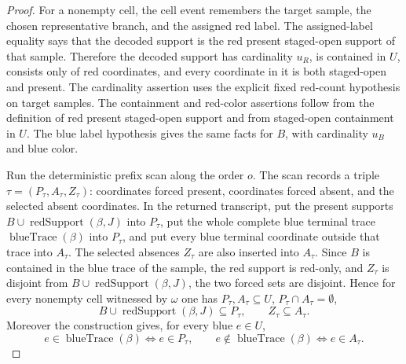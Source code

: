 \begin{proof}
For a nonempty cell, the cell event remembers the target sample, the chosen
representative branch, and the assigned red label.  The assigned-label
equality says that the decoded support is the red present staged-open support
of that sample.  Therefore the decoded support has cardinality \(u_R\), is
contained in \(U\), consists only of red coordinates, and every coordinate in
it is both staged-open and present.  The cardinality assertion uses the
explicit fixed red-count hypothesis on target samples.  The containment and
red-color assertions follow from the definition of red present staged-open
support and from staged-open containment in \(U\).  The blue label hypothesis
gives the same facts for \(B\), with cardinality \(u_B\) and blue color.

Run the deterministic prefix scan along the order \(o\).  The scan records a
triple \(\tau=(P_\tau,A_\tau,Z_\tau)\): coordinates forced present,
coordinates forced absent, and the selected absent coordinates.  In the
returned transcript, put the present supports
\(B\cup\operatorname{redSupport}(\beta,J)\) into \(P_\tau\), put the whole
complete blue terminal trace \(\operatorname{blueTrace}(\beta)\) into
\(P_\tau\), and put every blue terminal coordinate outside that trace into
\(A_\tau\).  The selected absences \(Z_\tau\) are also inserted into
\(A_\tau\).  Since \(B\) is contained in the blue trace of the sample, the
red support is red-only, and \(Z_\tau\) is disjoint from
\(B\cup\operatorname{redSupport}(\beta,J)\), the two forced sets are
disjoint.  Hence for every nonempty cell witnessed by \(\omega\) one has
\(P_\tau,A_\tau\subseteq U\), \(P_\tau\cap A_\tau=\emptyset\),
\[
B\cup\operatorname{redSupport}(\beta,J)\subseteq P_\tau,\qquad
Z_\tau\subseteq A_\tau.
\]
Moreover the construction gives, for every blue \(e\in U\),
\[
e\in\operatorname{blueTrace}(\beta)\Longleftrightarrow e\in P_\tau,
\qquad
e\notin\operatorname{blueTrace}(\beta)\Longleftrightarrow e\in A_\tau .
\]


\end{proof}
